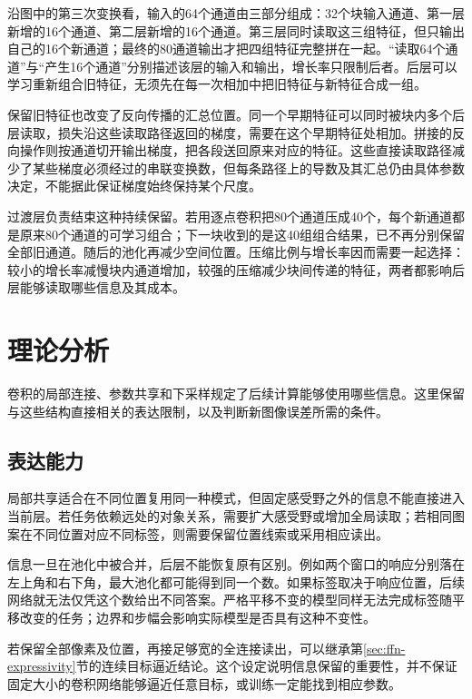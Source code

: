 沿图中的第三次变换看，输入的64个通道由三部分组成：32个块输入通道、第一层新增的16个通道、第二层新增的16个通道。第三层同时读取这三组特征，但只输出自己的16个新通道；最终的80通道输出才把四组特征完整拼在一起。“读取64个通道”与“产生16个通道”分别描述该层的输入和输出，增长率只限制后者。后层可以学习重新组合旧特征，无须先在每一次相加中把旧特征与新特征合成一组。

保留旧特征也改变了反向传播的汇总位置。同一个早期特征可以同时被块内多个后层读取，损失沿这些读取路径返回的梯度，需要在这个早期特征处相加。拼接的反向操作则按通道切开输出梯度，把各段送回原来对应的特征。这些直接读取路径减少了某些梯度必须经过的串联变换数，但每条路径上的导数及其汇总仍由具体参数决定，不能据此保证梯度始终保持某个尺度。

过渡层负责结束这种持续保留。若用逐点卷积把80个通道压成40个，每个新通道都是原来80个通道的可学习组合；下一块收到的是这40组组合结果，已不再分别保留全部旧通道。随后的池化再减少空间位置。压缩比例与增长率因而需要一起选择：较小的增长率减慢块内通道增加，较强的压缩减少块间传递的特征，两者都影响后层能够读取哪些信息及其成本。

\FloatBarrier


\section{理论分析}
\label{sec:cnn-theory}

卷积的局部连接、参数共享和下采样规定了后续计算能够使用哪些信息。这里保留与这些结构直接相关的表达限制，以及判断新图像误差所需的条件。

\subsection{表达能力}
\label{sec:cnn-expressivity}

局部共享适合在不同位置复用同一种模式，但固定感受野之外的信息不能直接进入当前层。若任务依赖远处的对象关系，需要扩大感受野或增加全局读取；若相同图案在不同位置对应不同标签，则需要保留位置线索或采用相应读出。

信息一旦在池化中被合并，后层不能恢复原有区别。例如两个窗口的响应分别落在左上角和右下角，最大池化都可能得到同一个数。如果标签取决于响应位置，后续网络就无法仅凭这个数给出不同答案。严格平移不变的模型同样无法完成标签随平移改变的任务；边界和步幅会影响实际模型是否具有这种不变性。

若保留全部像素及位置，再接足够宽的全连接读出，可以继承第\ref{sec:ffn-expressivity}节的连续目标逼近结论。这个设定说明信息保留的重要性，并不保证固定大小的卷积网络能够逼近任意目标，或训练一定能找到相应参数。

